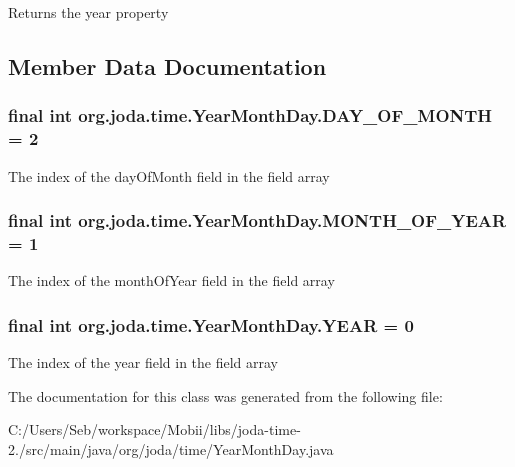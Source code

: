 \begin{DoxyReturn}{Returns}
the year property 
\end{DoxyReturn}


\subsection{Member Data Documentation}
\hypertarget{classorg_1_1joda_1_1time_1_1_year_month_day_a09237fdcc4215cb4ea13c8d15137ae59}{
\subsubsection[{D\-A\-Y\-\_\-\-O\-F\-\_\-\-M\-O\-N\-T\-H}]{\setlength{\rightskip}{0pt plus 5cm}final int org.\-joda.\-time.\-Year\-Month\-Day.\-D\-A\-Y\-\_\-\-O\-F\-\_\-\-M\-O\-N\-T\-H = 2\hspace{0.3cm}{\ttfamily [static]}}}\label{classorg_1_1joda_1_1time_1_1_year_month_day_a09237fdcc4215cb4ea13c8d15137ae59}
The index of the day\-Of\-Month field in the field array \hypertarget{classorg_1_1joda_1_1time_1_1_year_month_day_aa22dd68635327b3930f225cd3803b4f7}{
\subsubsection[{M\-O\-N\-T\-H\-\_\-\-O\-F\-\_\-\-Y\-E\-A\-R}]{\setlength{\rightskip}{0pt plus 5cm}final int org.\-joda.\-time.\-Year\-Month\-Day.\-M\-O\-N\-T\-H\-\_\-\-O\-F\-\_\-\-Y\-E\-A\-R = 1\hspace{0.3cm}{\ttfamily [static]}}}\label{classorg_1_1joda_1_1time_1_1_year_month_day_aa22dd68635327b3930f225cd3803b4f7}
The index of the month\-Of\-Year field in the field array \hypertarget{classorg_1_1joda_1_1time_1_1_year_month_day_a246b2a0db1ccba5ca9fce1046b1e0192}{
\subsubsection[{Y\-E\-A\-R}]{\setlength{\rightskip}{0pt plus 5cm}final int org.\-joda.\-time.\-Year\-Month\-Day.\-Y\-E\-A\-R = 0\hspace{0.3cm}{\ttfamily [static]}}}\label{classorg_1_1joda_1_1time_1_1_year_month_day_a246b2a0db1ccba5ca9fce1046b1e0192}
The index of the year field in the field array 

The documentation for this class was generated from the following file\-:\begin{DoxyCompactItemize}
\item 
C\-:/\-Users/\-Seb/workspace/\-Mobii/libs/joda-\/time-\/2./src/main/java/org/joda/time/Year\-Month\-Day.\-java\end{DoxyCompactItemize}
